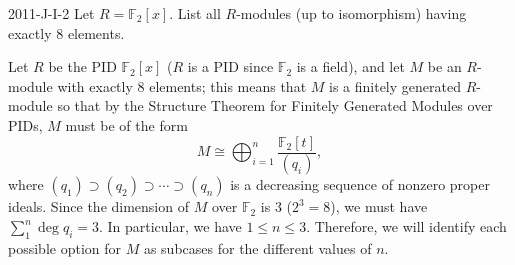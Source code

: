 \documentclass{article}
\begin{document}
	\begin{prb}{2011-J-I-2}
		Let $R = \mathbb{F}_{2}[x]$. List all $R$-modules (up to isomorphism) having exactly $8$ elements. 
	\end{prb}
	Let $R$ be the PID $\mathbb{F}_{2}[x]$ ($R$ is a PID since $\mathbb{F}_{2}$ is a field), and let $M$ be an $R$-module with exactly 8 elements; this means that $M$ is a finitely generated $R$-module so that by the Structure Theorem for Finitely Generated Modules over PIDs, $M$ must be of the form 
	\begin{equation*}
		M \cong \bigoplus_{i = 1}^{n}\frac{\mathbb{F}_{2}[t]}{(q_{i})},
	\end{equation*}
	where $(q_{1}) \supset (q_2) \supset \dotsm \supset (q_n)$ is a decreasing sequence of nonzero proper ideals. Since the dimension of $M$ over $\mathbb{F}_{2}$ is $3$ ($2^{3} = 8$), we must have $\sum_{1}^{n}\deg{q_i} = 3$. In particular, we have $1 \leq n \leq 3$. Therefore, we will identify each possible option for $M$ as subcases for the different values of $n$. \vspace{-0.25cm}
\end{document}
